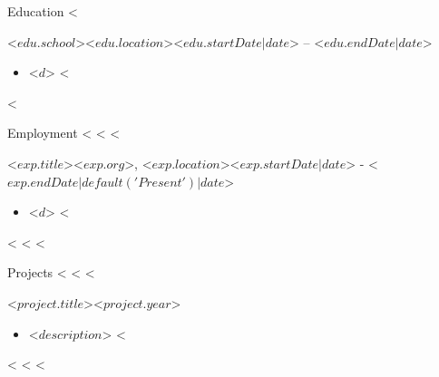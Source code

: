 \documentclass[]{mcdowellcv}
\begin{document}
	\makeheader
	

	\begin{cvsection}{Education}
		<%
		\begin{cvsubsection}{<$ edu.school $>}{<$ edu.location $>}{<$ edu.startDate | date $> -- <$ edu.endDate | date $>}
			\begin{itemize}
					<%
				\item <$ d $>
					<%
			\end{itemize}
		\end{cvsubsection}
		<%
	\end{cvsection}

	\begin{cvsection}{Employment}
		<%
		<%
		<%
		\begin{cvsubsection}{<$ exp.title $>}{<$ exp.org $>, <$ exp.location $>}{<$ exp.startDate | date $> - <$ exp.endDate | default('Present') | date $>}
			\begin{itemize}
			<%
				\item <$ d $>
			<%
			\end{itemize}
		\end{cvsubsection}
		<%
		<%
		<%
	\end{cvsection}
		
    \begin{cvsection}{Projects}
	<%
	<%
	<%
        \begin{cvsubsection}{<$ project.title $>}{}{<$ project.year $>}
            \begin{itemize}
		<%
		\item  <$ description $>
		<%
            \end{itemize}
        \end{cvsubsection}
	<%
	<%
	<%
	\end{cvsection}

	
\end{document}
